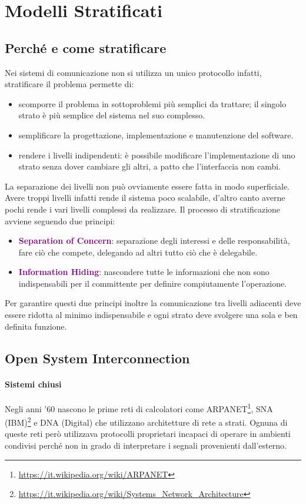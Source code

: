 \section{Modelli Stratificati}
\subsection{Perché e come stratificare}
Nei sistemi di comunicazione non si utilizza un unico protocollo infatti, stratificare il problema permette di:
\begin{itemize}
    \item scomporre il problema in sottoproblemi più semplici da trattare; il singolo strato è più semplice del sistema nel suo complesso.
    \item semplificare la progettazione, implementazione e manutenzione del software.
    \item rendere i livelli indipendenti: è possibile modificare l’implementazione di uno strato senza dover cambiare gli altri, a patto che l’interfaccia non cambi.
\end{itemize}

La separazione dei livelli non può ovviamente essere fatta in modo superficiale. Avere troppi livelli infatti rende il sistema poco scalabile, d'altro canto averne pochi rende i vari livelli complessi da realizzare. 
\newline Il processo di stratificazione avviene seguendo due principi:
\begin{itemize}
    \item \textbf{\textcolor{purple}{Separation of Concern}}: separazione degli interessi e delle responsabilità, fare ciò che compete, delegando ad altri tutto ciò che è delegabile.
    \item \textbf{\textcolor{purple}{Information Hiding}}: nascondere tutte le informazioni che non sono indispensabili per il committente per definire compiutamente l'operazione.
\end{itemize}
Per garantire questi due principi inoltre la comunicazione tra livelli adiacenti deve essere ridotta al minimo indispensabile e ogni strato deve svolgere una sola e ben definita funzione.

\subsection{Open System Interconnection}
\paragraph{Sistemi chiusi} Negli anni '60 nascono le prime reti di calcolatori come ARPANET\footnote{\url{https://it.wikipedia.org/wiki/ARPANET}}, SNA (IBM)\footnote{\url{https://it.wikipedia.org/wiki/Systems_Network_Architecture}} e DNA (Digital) che utilizzano architetture di rete a strati. Ognuna di queste reti però utilizzava protocolli proprietari incapaci di operare in ambienti condivisi perché non in grado di interpretare i segnali provenienti dall'esterno.

